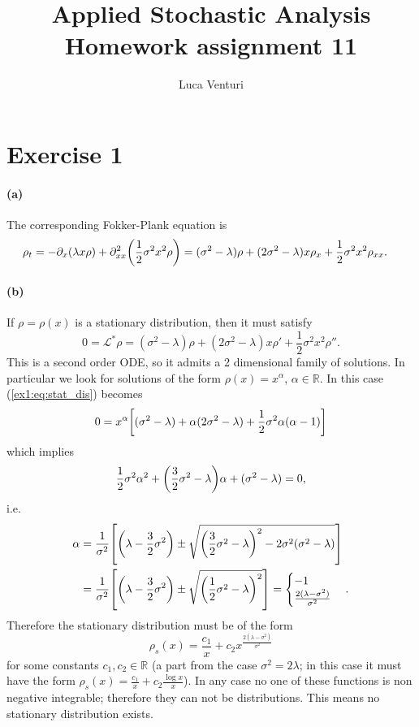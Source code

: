 \documentclass[a4paper,11pt]{article}
\theoremstyle{definition}
\theoremstyle{plain}
\theoremstyle{remark}
\DeclarePairedDelimiter{\parr}{(}{)}
\DeclarePairedDelimiter{\parq}{[}{]}
\begin{document}
\title{Applied Stochastic Analysis \\ Homework assignment 11}
\author{Luca Venturi}
\maketitle

\section*{Exercise 1}

\paragraph*{(a)}

The corresponding Fokker-Plank equation is
\begin{align*}
\rho_t & = -\partial_x(\lambda x\rho) + \partial^2_{xx}\parr*{\frac{1}{2}\sigma^2x^2\rho} = (\sigma^2-\lambda)\rho + (2\sigma^2 -\lambda)x\rho_x + \frac{1}{2}\sigma^2x^2\rho_{xx}.
\end{align*}

\paragraph*{(b)}

If $\rho=\rho(x)$ is a stationary distribution, then it must satisfy
\begin{equation}
0 = \mathcal{L}^*\rho = (\sigma^2-\lambda)\rho + (2\sigma^2 -\lambda)x\rho' + \frac{1}{2}\sigma^2x^2\rho''.\label{ex1:eq:stat_dis}
\end{equation}
This is a second order ODE, so it admits a 2 dimensional family of solutions. In particular we look for solutions of the form $\rho(x)=x^\alpha$, $\alpha\in\mathbb{R}$. In this case (\ref{ex1:eq:stat_dis}) becomes
$$
0 = x^\alpha\parq*{(\sigma^2-\lambda) + \alpha(2\sigma^2 -\lambda) + \frac{1}{2}\sigma^2\alpha(\alpha-1)}
$$
which implies
$$
\frac{1}{2}\sigma^2\alpha^2 +\parr*{\frac{3}{2}\sigma^2-\lambda}\alpha + (\sigma^2-\lambda) = 0,
$$
i.e.
\begin{align*}
\alpha & = \frac{1}{\sigma^2}\parq*{\parr*{\lambda-\frac{3}{2}\sigma^2}\pm\sqrt{\parr*{\frac{3}{2}\sigma^2-\lambda}^2-2\sigma^2(\sigma^2-\lambda)}} \\ & = \frac{1}{\sigma^2}\parq*{\parr*{\lambda-\frac{3}{2}\sigma^2}\pm\sqrt{\parr*{\frac{1}{2}\sigma^2-\lambda}^2}} =\begin{cases}-1 \\ \frac{2(\lambda-\sigma^2)}{\sigma^2}\end{cases}.
\end{align*}
Therefore the stationary distribution must be of the form 
$$
\rho_s(x) = \frac{c_1}{x} + c_2 x^{\frac{2(\lambda-\sigma^2)}{\sigma^2}}
$$
for some constants $c_1,c_2\in\mathbb{R}$ (a part from the case $\sigma^2=2\lambda$; in this case it must have the form $\rho_s(x) = \frac{c_1}{x} + c_2\frac{\log x}{x}$). In any case no one of these functions is non negative integrable; therefore they can not be distributions. This means no stationary distribution exists.
\end{document}
